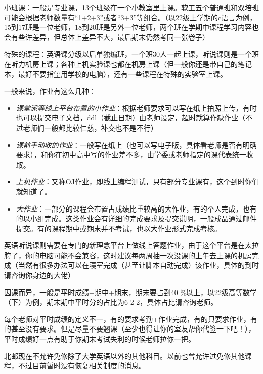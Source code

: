 小班课：一般是专业课，1\-3个班级在一个小教室里上课。软工五个普通班和双培班可能会根据老师数量有“1+2+3”或者“3+3”等组合。（以22级上学期的c语言为例，15到17班是一位老师，18到20班是另外一位老师，两个班在学期中课程学习内容也会有些许差异，但总体上差异不大，最后期末仍然考同一张卷子）

特殊的课程：英语课分级以后单独编班，一个班30人一起上课，听说课则是一个班在听力机房上课；各种上机实验课也都在机房上课（但一般你还是带自己的笔记本，最好不要指望用学校的电脑），还有一些课程在特殊的实验室上课。


一般来说，作业有这么几种：

\begin{itemize}
    \itshape
    \item \emph{课堂派等线上平台布置的小作业}：根据老师要求可以写在纸上拍照上传，有时也可以提交电子文档，ddl（截止日期）由老师设定，超时就算作缺作业（不过老师们一般都比较仁慈，补交也不是不行）
    \item \emph{课前手动收的作业}：一般写在纸上（也可以写电子版，具体看老师是否有明确要求），和你在初中高中写的作业差不多，由学委或老师指定的课代表统一收取。
    \item \emph{上机作业}：又称OJ作业，即线上编程测试，只有部分专业课有，这个到时你们就知道了。
    \item \emph{大作业}：一部分的课程会布置占成绩比重较高的大作业，有的个人完成，也有的以小组完成。这类作业会有详细的完成要求及提交说明，一般成品通过邮件提交。有的课程期中或期末并不考试，也以大作业形式完成考核。
\end{itemize}

英语听说课则需要在专门的新理念平台上做线上答题作业，由于这个平台是在太拉胯了，你的电脑可能不会兼容，这时建议每两周抽一次没课的上午去上课的机房完成（当然有很多办法可以在寝室完成（甚至让脚本自动完成）该作业，具体的到时请咨询你身边的大佬）


因课而异，一般是平时成绩+期中+期末，期末要占到40 \%以上，以22级高等数学（下）为例，期末期中平时分的占比为6-2-2，具体占比请咨询老师。

每个老师对平时成绩的定义不一，有的要求考勤+作业完成，有的只要求作业，有的甚至没有要求。但是尽量不要翘课（至少也得让你的室友帮你代签一下吧！），平时成绩好一点有助于你期末考试失利的时候老师拉你一把。


北邮现在不允许免修除了大学英语以外的其他科目。以前也曾允许过免修其他课程，不过目前暂时没有恢复相关制度的消息。

